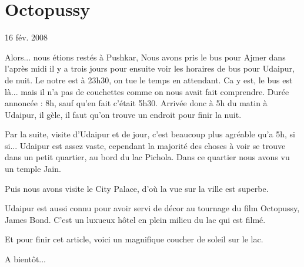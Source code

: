 \section{Octopussy}

16 fév. 2008

\begin{multicols}{2}

Alors... nous étions restés à Pushkar, Nous avons pris le bus pour Ajmer dans l'après midi il y a trois jours pour ensuite voir les horaires de bus pour Udaipur, de nuit. Le notre est à 23h30, on tue le temps en attendant. Ca y est, le bus est là... mais il n'a pas de couchettes comme on nous avait fait comprendre. Durée annoncée : 8h, sauf qu'en fait c'était 5h30. Arrivée donc à 5h du matin à Udaipur, il gèle, il faut qu'on trouve un endroit pour finir la nuit.

Par la suite, visite d'Udaipur et de jour, c'est beaucoup plus agréable qu'a 5h, si si... Udaipur est assez vaste, cependant la majorité des choses à voir se trouve dans un petit quartier, au bord du lac Pichola. Dans ce quartier nous avons vu un temple Jain.


Puis nous avons visite le City Palace, d'où la vue sur la ville est superbe.


Udaipur est aussi connu pour avoir servi de décor au tournage du film Octopussy, James Bond. C'est un luxueux hôtel en plein milieu du lac qui est filmé.


Et pour finir cet article, voici un magnifique coucher de soleil sur le lac.


A bientôt...

\end{multicols}


